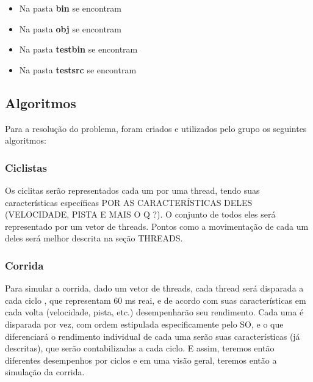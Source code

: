\documentclass[12pt,a4paper]{article}
\begin{document}
\begin{itemize}
    \item Na pasta \textbf{bin} se encontram 
    
    \item Na pasta \textbf{obj} se encontram 
        
    \item Na pasta \textbf{testbin} se encontram 
    
    \item Na pasta \textbf{testsrc} se encontram 

    \end{itemize} %


\subsection{Algoritmos}

	Para a resolução do problema, foram criados e utilizados pelo grupo os seguintes algoritmos:
    
\subsubsection{Ciclistas}

	Os ciclitas serão representados cada um por uma thread, tendo suas características específicas POR AS CARACTERÍSTICAS DELES (VELOCIDADE, PISTA E MAIS O Q ?). O conjunto de todos eles será representado por um vetor de threads.
    Pontos como a movimentação de cada um deles será melhor descrita na seção THREADS.

\subsubsection{Corrida}

	Para simular a corrida, dado um vetor de threads, cada thread será disparada a cada ciclo , que representam 60 ms reai, e de acordo com suas características em cada volta (velocidade, pista, etc.) desempenharão seu rendimento. Cada uma é disparada por vez, com ordem estipulada especificamente pelo SO, e o que diferenciará o rendimento individual de cada uma serão suas características (já descritas), que serão contabilizadas a cada ciclo. E assim, teremos então diferentes desempenhos por ciclos e em uma visão geral, teremos então a simulação da corrida. 
\end{document}
